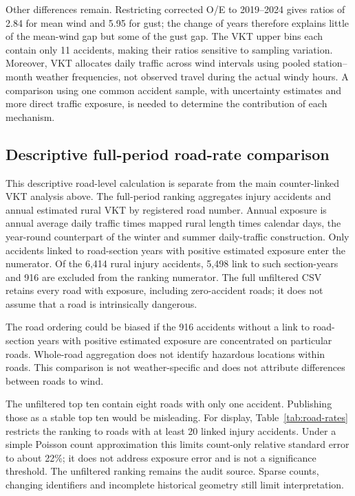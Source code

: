 Other differences remain. Restricting corrected O/E to 2019--2024 gives ratios of 2.84 for mean wind and 5.95 for gust; the change of years therefore explains little of the mean-wind gap but some of the gust gap. The VKT upper bins each contain only 11 accidents, making their ratios sensitive to sampling variation. Moreover, VKT allocates daily traffic across wind intervals using pooled station--month weather frequencies, not observed travel during the actual windy hours. A comparison using one common accident sample, with uncertainty estimates and more direct traffic exposure, is needed to determine the contribution of each mechanism.



\subsection{Descriptive full-period road-rate comparison}
\label{sec:road-rates}

This descriptive road-level calculation is separate from the main counter-linked VKT analysis above. The full-period ranking aggregates injury accidents and annual estimated rural VKT by registered road number. Annual exposure is annual average daily traffic times mapped rural length times calendar days, the year-round counterpart of the winter and summer daily-traffic construction. Only accidents linked to road-section years with positive estimated exposure enter the numerator. Of the 6,414 rural injury accidents, 5,498 link to such section-years and 916 are excluded from the ranking numerator. The full unfiltered CSV retains every road with exposure, including zero-accident roads; it does not assume that a road is intrinsically dangerous.

The road ordering could be biased if the 916 accidents without a link to road-section years with positive estimated exposure are concentrated on particular roads. Whole-road aggregation does not identify hazardous locations within roads. This comparison is not weather-specific and does not attribute differences between roads to wind.

The unfiltered top ten contain eight roads with only one accident. Publishing those as a stable top ten would be misleading. For display, Table~\ref{tab:road-rates} restricts the ranking to roads with at least 20 linked injury accidents. Under a simple Poisson count approximation this limits count-only relative standard error to about 22\%; it does not address exposure error and is not a significance threshold. The unfiltered ranking remains the audit source. Sparse counts, changing identifiers and incomplete historical geometry still limit interpretation.

